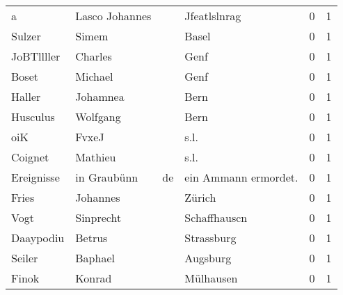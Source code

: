 \begin{center}
\begin{tiny}
\begin{longtabu}{llllrr}
                        a &                     Lasco Johannes &             &                                Jfeatlslnrag &          0 &         1 \\
                   Sulzer &                              Simem &             &                                       Basel &          0 &         1 \\
               JoBTllller &                            Charles &             &                                        Genf &          0 &         1 \\
                    Boset &                            Michael &             &                                        Genf &          0 &         1 \\
                   Haller &                           Johamnea &             &                                        Bern &          0 &         1 \\
                 Husculus &                           Wolfgang &             &                                        Bern &          0 &         1 \\
                      oiK &                              FvxeJ &             &                                        s.l. &          0 &         1 \\
                  Coignet &                            Mathieu &             &                                        s.l. &          0 &         1 \\
               Ereignisse &                        in Graubünn &          de &                       ein Ammann ermordet.  &          0 &         1 \\
                    Fries &                           Johannes &             &                                      Zürich &          0 &         1 \\
                     Vogt &                          Sinprecht &             &                                Schaffhauscn &          0 &         1 \\
                Daaypodiu &                             Betrus &             &                                  Strassburg &          0 &         1 \\
                   Seiler &                            Baphael &             &                                    Augsburg &          0 &         1 \\
                    Finok &                             Konrad &             &                                   Mülhausen &          0 &         1 \\

\end{longtabu}
\end{tiny}
\end{center}
